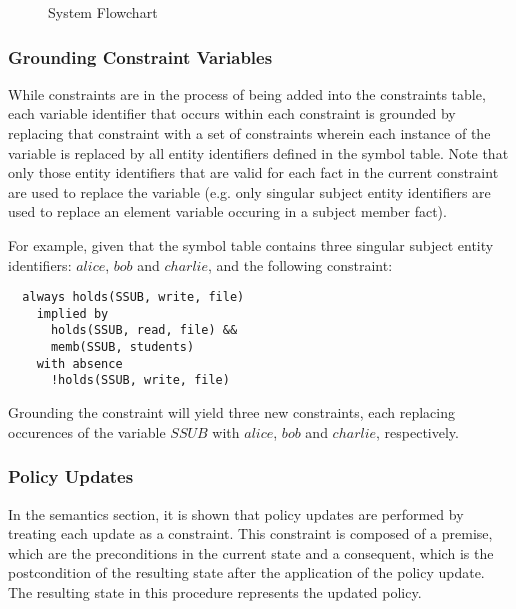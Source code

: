 \documentclass[10pt, twocolumn]{article}
\begin{document}
      \begin{figure}[ht]
        \begin{center}
          \caption{System Flowchart}
          \label{fig-2}
        \end{center}
      \end{figure}

      \subsubsection{Grounding Constraint Variables}

        While constraints are in the process of being added into the
        constraints table, each variable identifier that occurs within each
        constraint is grounded by replacing that constraint with a set of
        constraints wherein each instance of the variable is replaced by all
        entity identifiers defined in the symbol table. Note that only those
        entity identifiers that are valid for each fact in the current
        constraint are used to replace the variable (e.g. only singular subject entity
        identifiers are used to replace an element variable occuring in a
        subject member fact). 

        For example, given that the symbol table contains three singular
        subject entity identifiers: $alice$, $bob$ and $charlie$, and the
        following constraint:

        \begin{verbatim}
  always holds(SSUB, write, file)
    implied by
      holds(SSUB, read, file) &&
      memb(SSUB, students)
    with absence
      !holds(SSUB, write, file)
        \end{verbatim}

        Grounding the constraint will yield three new constraints, each
        replacing occurences of the variable $SSUB$ with $alice$, $bob$ and
        $charlie$, respectively.

      \subsubsection{Policy Updates}

        In the semantics section, it is shown that policy updates are performed
        by treating each update as a constraint. This constraint is composed of
        a premise, which are the preconditions in the current state and a 
        consequent, which is the postcondition of the resulting state after the
        application of the policy update. The resulting state in this procedure
        represents the updated policy.
\end{document}
